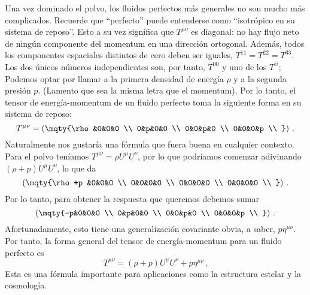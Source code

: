 \documentclass[11pt,b5paper,openany,twoside]{book}
\newcommand{\mn}{{\mu\nu}}
\begin{document}
Una vez dominado el polvo, los fluidos perfectos más generales no son mucho más complicados.
Recuerde que ``perfecto'' puede entenderse como ``isotrópico en su sistema de reposo''. Esto a su vez significa que $T^\mn$ es diagonal: no hay flujo neto de ningún componente del momentum en una dirección ortogonal.
Además, todos los componentes espaciales distintos de cero deben ser iguales, $T^{11} = T^{22}=T^{33}$.
Los dos únicos números independientes son, por tanto, $T^{00}$ y uno de los $T^{ii}$; Podemos optar por llamar a la primera densidad de energía $\rho$ y a la segunda presión $p$.
(Lamento que sea la misma letra que el momentum).
Por lo tanto, el tensor de energía-momentum de un fluido perfecto toma la siguiente forma en su sistema de reposo:
\begin{equation}
T^\mn = \left(\mqty{\rho&0&0&0 \\  0&p&0&0 \\  0&0&p&0 \\
0&0&0&p \\ }\right)\,.\label{1.107}
\end{equation}
Naturalmente nos gustaría una fórmula que fuera buena en cualquier contexto.
Para el polvo teníamos $T^\mn = \rho U^\mu U^\nu$, por lo que podríamos comenzar adivinando $(\rho+p)U^\mu U^\nu$, lo que da
\begin{equation}
\left(\mqty{\rho+p &0&0&0 \\  0&0&0&0 \\  0&0&0&0 \\
0&0&0&0 \\ }\right)\,.\label{1.108}
\end{equation}
Por lo tanto, para obtener la respuesta que queremos debemos sumar
\begin{equation}
\left(\mqty{-p&0&0&0 \\  0&p&0&0 \\  0&0&p&0 \\
0&0&0&p \\ }\right)\,.\label{1.109}
\end{equation}
Afortunadamente, esto tiene una generalización covariante obvia, a saber, $p\eta^\mn$.
Por tanto, la forma general del tensor de energía-momentum para un fluido perfecto es
\begin{equation}
T^\mn = (\rho+p) U^\mu U^\nu + p\eta^\mn\,.\label{1.110}
\end{equation}
Esta es una fórmula importante para aplicaciones como la estructura estelar y la cosmología.
\end{document}
